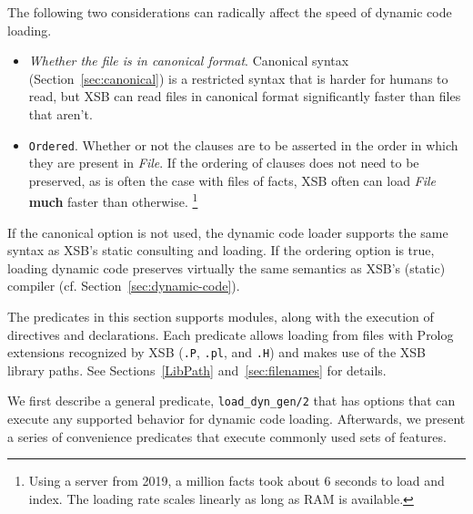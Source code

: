 The following two considerations can radically affect the speed of
dynamic code loading.
\begin{itemize}
\item {\em Whether the file is in canonical format}.  Canonical syntax
  (Section~\ref{sec:canonical}) is a restricted syntax that is harder
  for humans to read, but XSB can read files in canonical format
  significantly faster than files that aren't.
\item {\tt Ordered}.  Whether or not the clauses are to be asserted in
  the order in which they are present in {\em File}.  If the ordering
  of clauses does not need to be preserved, as is often the case with
  files of facts, XSB often can load {\em File} {\bf much} faster than
  otherwise. \footnote{Using a server from 2019, a million facts took
    about 6 seconds to load and index.  The loading rate scales
    linearly as long as RAM is available.}  
\end{itemize}  

If the canonical option is not used, the dynamic code loader supports
the same syntax as XSB's static consulting and loading.  If the
ordering option is true, loading dynamic code preserves virtually the
same semantics as XSB's (static) compiler
(cf. Section~\ref{sec:dynamic-code}).

The predicates in this section supports modules, along with the
execution of directives and declarations.  Each predicate allows
loading from files with Prolog extensions recognized by XSB ({\tt .P},
{\tt .pl}, and {\tt .H}) and makes use of the XSB library paths.  See
Sections~\ref{LibPath} and~\ref{sec:filenames} for details.

We first describe a general predicate, {\tt load\_dyn\_gen/2} that has
options that can execute any supported behavior for dynamic code
loading.  Afterwards, we present a series of convenience predicates
that execute commonly used sets of features.

